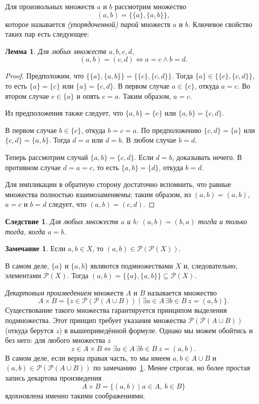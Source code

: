 \documentclass[12pt,notitlepage]{article}
\theoremstyle{plain}
\newtheorem{lemma}[thm]{Лемма}
\newtheorem{corr}[thm]{Следствие}
\theoremstyle{definition}
\newtheorem{rem}[thm]{Замечание}
\theoremstyle{plain}
\newcommand{\sbs}{\subseteq}
\newcommand{\mP}{\mathcal{P}}
\newcommand{\1}{\mathbf{1}}
\newcommand{\0}{\mathbf{0}}
\begin{document}
Для произвольных множеств $a$ и $b$ рассмотрим множество
$$(a,b) = \{\{a\}, \{a, b\}\},$$
которое называется \emph{(упорядоченной) парой} множеств $a$ и $b$. Ключевое свойство таких пар есть следующее:
\begin{lemma}\label{ch0:pair}
	Для любых множеств $a, b, c, d$, 
	$$(a, b) = (c, d) \iff a = c \wedge b = d.$$
\end{lemma}
\begin{proof}
	Предположим, что $\{\{a\}, \{a, b\}\} = \{\{c\}, \{c, d\}\}$. Тогда $\{a\} \in \{\{c\}, \{c, d\}\}$, то есть $\{a\} = \{c\}$ или $\{a\} = \{c, d\}$. В первом случае $a \in \{c\}$, откуда $a = c$. Во втором случае $c \in \{a\}$ и опять $c = a$. Таким образом, $a = c$.
	
	Из предположения также следует, что $\{a, b\} = \{c\}$ или $\{a, b\} = \{c, d\}$. 
	
	В первом случае $b \in \{c\}$, откуда $b = c = a$. По предположению $\{c,d\} = \{a\}$ или $\{c,d\} = \{a,b\}$. Тогда $d = a$ или $d = b$. В любом случае $b = d$.
	
	Теперь рассмотрим случай $\{a, b\} = \{c, d\}$. Если $d = b$, доказывать нечего. В противном случае $d = a = c$, то есть $\{a, b\} = \{d\}$, откуда $b = d$.
	
	Для импликации в обратную сторону достаточно вспомнить, что равные множества полностью взаимозаменяемы; таким образом, из $(a, b) = (a, b)$, $a = c$ и $b = d$ следует, что $(a, b) = (c, d)$.
\end{proof}
\begin{corr}
	Для любых множеств $a$ и $b$: $(a, b) = (b, a)$ тогда и только тогда, когда $a = b$.
\end{corr}

\begin{rem}\label{L4:pair_collect}
	Если $a, b \in X$, то $(a, b) \in \mP (\mP (X))$.
	
	В самом деле, $\{a\}$ и $\{a,b\}$ являются подмножествами $X$ и, следовательно, элементами $\mP(X)$. Тогда $(a,b) = \{ \{a\}, \{ a,b\} \} \sbs \mP(X)$.
\end{rem}
\noindent\emph{Декартовым произведением} множеств $A$ и $B$ называется множество
$$A \times B = \{z \in \mP (\mP (A \cup B)) \mid \exists a \in A\, \exists b \in B\ z = (a, b) \}.$$
Существование такого множества гарантируется принципом выделения подмножества. Этот принцип требует указания множества $\mP (\mP (A \cup B))$ (откуда берутся $z$) в вышеприведённой формуле. Однако мы можем обойтись и без него: для любого множества $z$
$$z \in A \times B \iff \exists a \in A\, \exists b \in B\ z = (a, b).$$
В самом деле, если верна правая часть, то мы имеем $a, b \in A \cup B$ и $(a,b) \in \mP (\mP (A \cup B))$ по замечанию~\ref{L4:pair_collect}. Менее строгая, но более простая запись декартова произведения
$$A \times B = \{(a, b) \mid a \in A,\ b \in B\}$$
вдохновлена именно такими соображениями.
\end{document}
